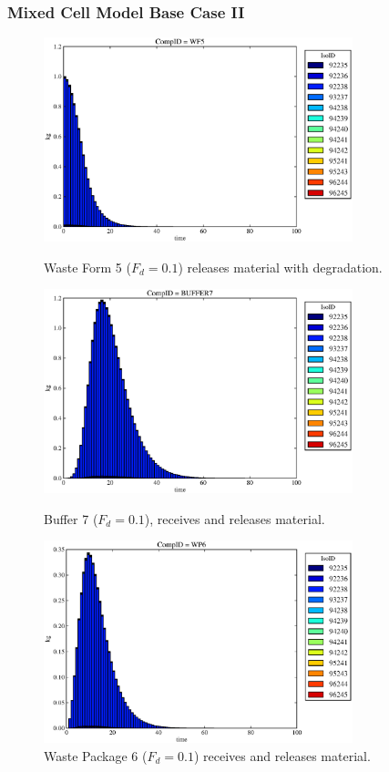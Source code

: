\begin{frame}[ctb!]
  \frametitle{Mixed Cell Model Base Case II}
  \begin{figure}
\begin{minipage}[b]{0.45\linewidth}

  \includegraphics[width=0.8\textwidth]{./images/mcIII1.eps}
  \caption[MCI Waste Form Contaminants.]{
    Waste Form 5 ($F_d = 0.1$) releases material with degradation. 
    }
  \label{fig:mcIIIwf5}
  
  \includegraphics[width=0.8\textwidth]{./images/mcIII3.eps}
  \caption[Case MCI Buffer Contaminants]{
    Buffer 7 ($F_d=0.1$), receives and releases material.
    }
  \label{fig:mcIIIbuff}

\end{minipage}
\hspace{0.05\linewidth}
\begin{minipage}[b]{0.45\linewidth}
  \includegraphics[width=0.8\textwidth]{./images/mcIII2.eps}
  \caption[Case MCI Waste Package Contaminants.]{ 
    Waste Package 6 ($F_d = 0.1$) receives and releases material. 
    }
  \label{fig:mcIIIwp6}


\end{minipage}
\end{figure}
\end{frame}
